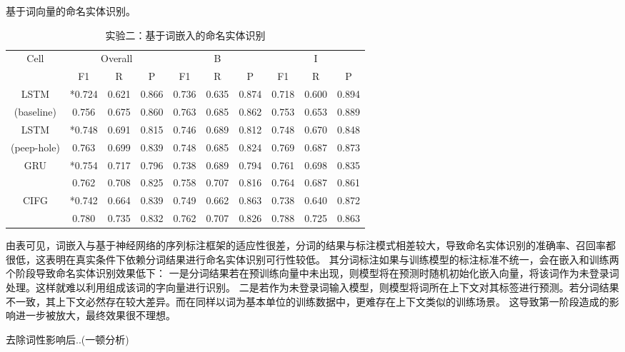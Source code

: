 基于词向量的命名实体识别。
\begin{table}[H]
    \centering
    \caption{实验二：基于词嵌入的命名实体识别}
    \begin{tabular}{cccccccccc}
        \toprule
            \multirow{2}{*}{Cell} &\multicolumn{3}{c}{Overall} &\multicolumn{3}{c}{B} &\multicolumn{3}{c}{I}\\
            \cmidrule(lr){2-4} \cmidrule(lr){5-7} \cmidrule(lr){8-10}
            & F1 & R & P & F1 & R & P & F1 & R & P\\
        \midrule
            LSTM & *0.724 & 0.621 & 0.866 & 0.736 & 0.635 & 0.874 & 0.718 & 0.600 & 0.894\\
            (baseline) & 0.756 & 0.675 & 0.860 & 0.763 & 0.685 & 0.862 & 0.753 & 0.653 & 0.889\\
            LSTM & *0.748 & 0.691 & 0.815 & 0.746 & 0.689 & 0.812 & 0.748 & 0.670 & 0.848\\
            (peep-hole) & 0.763 & 0.699 & 0.839 & 0.748 & 0.685 & 0.824 & 0.769 & 0.687 & 0.873\\
            \multirow{2}{2cm}{GRU} & *0.754 & 0.717 & 0.796 & 0.738 & 0.689 & 0.794 & 0.761 & 0.698 & 0.835\\
                                 & 0.762 & 0.708 & 0.825 & 0.758 & 0.707 & 0.816 & 0.764 & 0.687 & 0.861\\
            \multirow{2}{2cm}{CIFG} & *0.742 & 0.664 & 0.839 & 0.749 & 0.662 & 0.863 & 0.738 & 0.640 & 0.872\\
                                  & 0.780 & 0.735 & 0.832 & 0.762 & 0.707 & 0.826 & 0.788 & 0.725 & 0.863\\
        \bottomrule
    \end{tabular}
    \label{tab:tab1}
\end{table}
由表可见，词嵌入与基于神经网络的序列标注框架的适应性很差，分词的结果与标注模式相差较大，导致命名实体识别的准确率、召回率都很低，这表明在真实条件下依赖分词结果进行命名实体识别可行性较低。
其分词标注如果与训练模型的标注标准不统一，会在嵌入和训练两个阶段导致命名实体识别效果低下：
一是分词结果若在预训练向量中未出现，则模型将在预测时随机初始化嵌入向量，将该词作为未登录词处理。这样就难以利用组成该词的字向量进行识别。
二是若作为未登录词输入模型，则模型将词所在上下文对其标签进行预测。若分词结果不一致，其上下文必然存在较大差异。而在同样以词为基本单位的训练数据中，更难存在上下文类似的训练场景。
这导致第一阶段造成的影响进一步被放大，最终效果很不理想。

去除词性影响后..(一顿分析)

